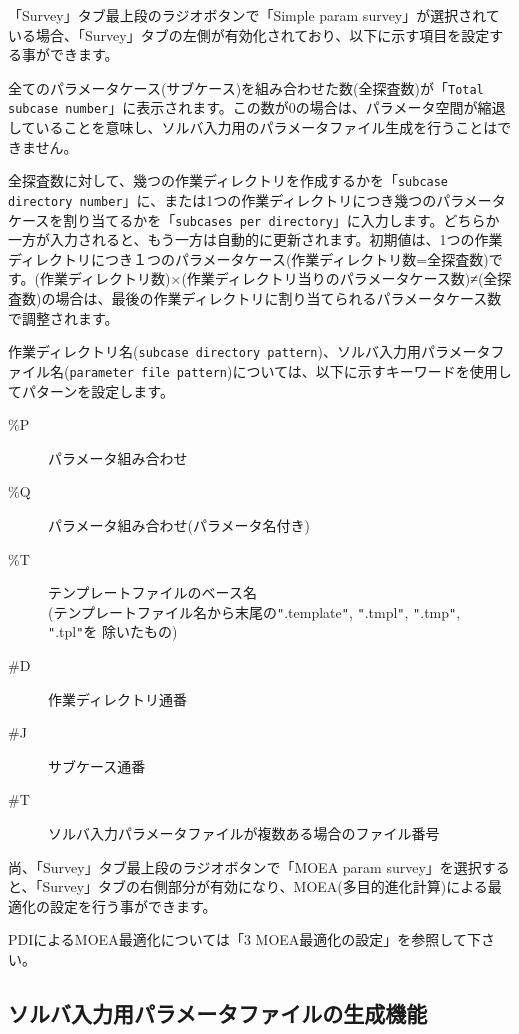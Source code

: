 \documentclass[a4paper,11pt]{jarticle}
\begin{document}
「Survey」タブ最上段のラジオボタンで「Simple param survey」が選択されている場合、「Survey」タブの左側が有効化されており、以下に示す項目を設定する事ができます。

全てのパラメータケース(サブケース)を組み合わせた数(全探査数)が「{\tt Total subcase number}」に表示されます。この数が0の場合は、パラメータ空間が縮退していることを意味し、ソルバ入力用のパラメータファイル生成を行うことはできません。

全探査数に対して、幾つの作業ディレクトリを作成するかを「{\tt subcase directory number}」に、または1つの作業ディレクトリにつき幾つのパラメータケースを割り当てるかを「{\tt subcases per directory}」に入力します。どちらか一方が入力されると、もう一方は自動的に更新されます。初期値は、1つの作業ディレクトリにつき１つのパラメータケース(作業ディレクトリ数=全探査数)です。(作業ディレクトリ数)×(作業ディレクトリ当りのパラメータケース数)≠(全探査数)の場合は、最後の作業ディレクトリに割り当てられるパラメータケース数で調整されます。

作業ディレクトリ名({\tt subcase directory pattern})、ソルバ入力用パラメータファイル名({\tt parameter file pattern})については、以下に示すキーワードを使用してパターンを設定します。

\begin{description}
\item[\%P] パラメータ組み合わせ
\item[\%Q] パラメータ組み合わせ(パラメータ名付き)
\item[\%T] テンプレートファイルのベース名\\
(テンプレートファイル名から末尾の\texttt{"}.template\texttt{"}, 
\texttt{"}.tmpl\texttt{"}, \texttt{"}.tmp\texttt{"}, \texttt{"}.tpl\texttt{"}を 除いたもの)
\item[\#D] 作業ディレクトリ通番
\item[\#J] サブケース通番
\item[\#T] ソルバ入力パラメータファイルが複数ある場合のファイル番号
\end{description}

\bigskip

尚、「Survey」タブ最上段のラジオボタンで「MOEA param survey」を選択すると、「Survey」タブの右側部分が有効になり、MOEA(多目的進化計算)による最適化の設定を行う事ができます。

PDIによるMOEA最適化については「3 MOEA最適化の設定」を参照して下さい。


\subsection{ソルバ入力用パラメータファイルの生成機能}
\end{document}
